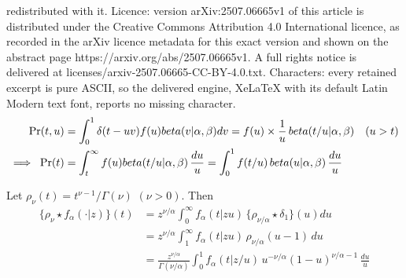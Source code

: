 \documentclass[10pt,a4paper]{amsart}
\begin{document}
redistributed with it. Licence: version arXiv:2507.06665v1 of this article is distributed under the Creative Commons Attribution 4.0 International licence, as recorded in the arXiv licence metadata for this exact version and shown on the abstract page https://arxiv.org/abs/2507.06665v1. A full rights notice is delivered at licenses/arxiv-2507.06665-CC-BY-4.0.txt. Characters: every retained excerpt is pure ASCII, so the delivered engine, XeLaTeX with its default Latin Modern text font, reports no missing character.
\begin{align}
\Pr(t,u) &= \int_0^1 \delta(t-uv) f(u) {\rm beta}(v\vert \alpha,\beta) dv =  f(u) \times \frac{1}{u} \, {\rm beta}(t/u \vert \alpha,\beta) \quad (u>t) 
 \label{eq:jointdensity} \\
\implies \; \Pr(t) &= \int_t^\infty f(u) {\rm beta}(t/u \vert \alpha,\beta) \, \frac{du}{u}
  = \int_0^1 f(t/u) \, {\rm beta}(u\vert \alpha,\beta) \, \frac{du}{u}  %
 \label{eq:productdensity}
\end{align}

\begin{theorem}
\label{thm:rho_stable_convolution}
Let  $\rho_\nu(t)=t^{\nu-1}/\Gamma(\nu)$ $(\nu>0)$. %
Then
\begin{align}
\{\rho_{\nu} \star f_\alpha(\cdot\vert z)\}(t)
&=   z^{\nu/\alpha} \int_0^\infty f_\alpha(t\vert z u)\, \{\rho_{\nu/\alpha} \star \delta_1\}(u) du 
\label{eq:power_stable_conv}  \\
&=   z^{\nu/\alpha} \int_1^\infty f_\alpha(t\vert z u)\, \rho_{\nu/\alpha} (u-1) \,  du 
\label{eq:power_stable_conv1}  \\
&=  \frac{z^{\nu/\alpha}}{\Gamma(\nu/\alpha)}
  \int_0^1 f_\alpha(t\vert z/u) \, u^{-\nu/\alpha}  (1-u)^{\nu/\alpha-1}  \, \frac{du}{u} 
  \label{eq:power_stable_conv_betadensity} 
\end{align}
\end{theorem}
\end{document}
